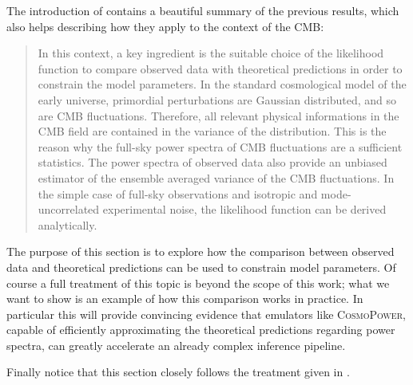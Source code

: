 

The introduction of \cite{likelihood_cmb} contains a beautiful summary of the previous results, which also helps describing how they apply to the context of the CMB:
\begin{quote}
    In this context, a key ingredient is the suitable choice of the likelihood function to compare observed data with theoretical predictions in order to constrain the model parameters. In the standard cosmological model of the early universe, primordial perturbations are Gaussian distributed, and so are CMB fluctuations. Therefore, all relevant physical informations in the CMB field are contained in the variance of the distribution. This is the reason why the full-sky power spectra of CMB fluctuations are a sufficient statistics. The power spectra of observed data also provide an unbiased estimator of the ensemble averaged variance of the CMB fluctuations. In the simple case of full-sky observations and isotropic and mode-uncorrelated experimental noise, the likelihood function can be derived analytically.
\end{quote}
The purpose of this section is to explore how the comparison between observed data and theoretical predictions can be used to constrain model parameters. Of course a full treatment of this topic is beyond the scope of this work; what we want to show is an example of how this comparison works in practice. In particular this will provide convincing evidence that emulators like \textsc{CosmoPower}, capable of efficiently approximating the theoretical predictions regarding power spectra, can greatly accelerate an already complex inference pipeline.

Finally notice that this section closely follows the treatment given in \cite{likelihood_cmb}.

